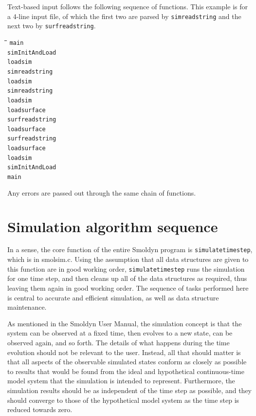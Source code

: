 \documentclass {scrbook}
\newcommand {\ttt} {\texttt}
\begin{document}
Text-based input follows the following sequence of functions. This example is for a 4-line input file, of which the first two are parsed by \ttt{simreadstring} and the next two by \ttt{surfreadstring}.
\begin{tabbing}
\hspace{0.25in}\=\hspace{0.25in}\=\hspace{0.25in}\=\hspace{0.25in}\=\hspace{0.25in}\=\kill
\>\ttt{main}\\
\>\>\ttt{simInitAndLoad}\\
\>\>\>\ttt{loadsim}\\
\>\>\>\>\ttt{simreadstring}\\
\>\>\>\ttt{loadsim}\\
\>\>\>\>\ttt{simreadstring}\\
\>\>\>\ttt{loadsim}\\
\>\>\>\>\ttt{loadsurface}\\
\>\>\>\>\>\ttt{surfreadstring}\\
\>\>\>\>\ttt{loadsurface}\\
\>\>\>\>\>\ttt{surfreadstring}\\
\>\>\>\>\ttt{loadsurface}\\
\>\>\>\ttt{loadsim}\\
\>\>\ttt{simInitAndLoad}\\
\>\ttt{main}
\end{tabbing}

Any errors are passed out through the same chain of functions.

\section{Simulation algorithm sequence}

In a sense, the core function of the entire Smoldyn program is \ttt{simulatetimestep}, which is in smolsim.c. Using the assumption that all data structures are given to this function are in good working order, \ttt{simulatetimestep} runs the simulation for one time step, and then cleans up all of the data structures as required, thus leaving them again in good working order. The sequence of tasks performed here is central to accurate and efficient simulation, as well as data structure maintenance.

As mentioned in the Smoldyn User Manual, the simulation concept is that the system can be observed at a fixed time, then evolves to a new state, can be observed again, and so forth. The details of what happens during the time evolution should not be relevant to the user. Instead, all that should matter is that all aspects of the observable simulated states conform as closely as possible to results that would be found from the ideal and hypothetical continuous-time model system that the simulation is intended to represent. Furthermore, the simulation results should be as independent of the time step as possible, and they should converge to those of the hypothetical model system as the time step is reduced towards zero.
\end{document}
